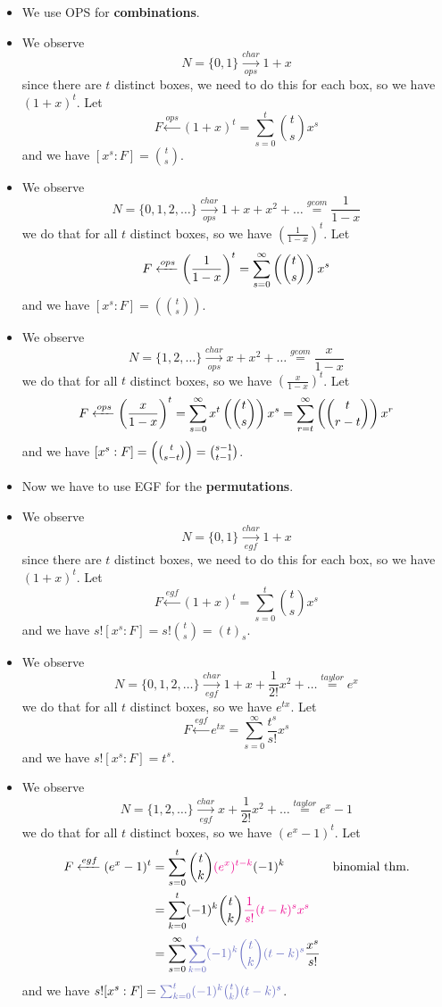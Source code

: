 \documentclass[12pt]{article}
\begin{document}
\begin{itemize}
    \item[] We use OPS for \textbf{combinations}.
    \item[\circled{2}] We observe \[N=\{0,1\}\xrightarrow[ops]{char} 1+x\] 
    since there are $t$ distinct boxes, we need to do this for each box, so we have $(1+x)^t$. Let \[F\xleftarrow{ops}(1+x)^t=\sum_{s=0}^{t}{t\choose s}x^s\] and we have $[x^s:F]={t\choose s}$.
    \item[\circled{6}] We observe \[N=\{0,1,2,\dots\}\xrightarrow[ops]{char} 1+x+x^2+\dots \stackrel{geom}{=} \frac{1}{1-x}\] we do that for all $t$ distinct boxes, so we have $\left(\frac{1}{1-x}\right)^t$. Let \[F\xleftarrow{ops}\left(\frac{1}{1-x}\right)^t=\sum_{s=0}^{\infty}\left({t\choose s}\right)x^s\] and we have $[x^s:F]=\left({t\choose s}\right)$.
    \item[\circled{10}]  We observe \[N=\{1,2,\dots\}\xrightarrow[ops]{char} x+x^2+\dots \stackrel{geom}{=} \frac{x}{1-x}\] we do that for all $t$ distinct boxes, so we have $\left(\frac{x}{1-x}\right)^t$. Let \[F\xleftarrow{ops}\left(\frac{x}{1-x}\right)^t=\sum_{s=0}^{\infty}x^t \left({t\choose s}\right)x^s = \sum_{r=t}^{\infty}\left({t\choose r-t}\right)x^r\] and we have $[x^s:F]=\left({t\choose s-t}\right)={s-1\choose t-1}$.
    \item[] Now we have to use EGF for the \textbf{permutations}.
    \item[\circled 1] We observe \[N=\{0,1\}\xrightarrow[egf]{char} 1+x\] since there are $t$ distinct boxes, we need to do this for each box, so we have $(1+x)^t$. Let \[F\xleftarrow{egf}(1+x)^t=\sum_{s=0}^{t}{t\choose s}x^s\] and we have $s![x^s:F]=s!{t\choose s} = (t)_s$.
    \item[\circled 5] We observe \[N=\{0,1,2,\dots\}\xrightarrow[egf]{char} 1+x+\frac{1}{2!}x^2+\dots \stackrel{taylor}{=} e^x\] we do that for all $t$ distinct boxes, so we have $e^{tx}$. Let \[F\xleftarrow{egf}e^{tx}=\sum_{s=0}^{\infty}\frac{t^s}{s!}x^s\] and we have $s![x^s:F]=t^s$.
    \item[\circled 9] We observe \[N=\{1,2,\dots\}\xrightarrow[egf]{char} x+\frac{1}{2!}x^2+\dots \stackrel{taylor}{=} e^x-1\] we do that for all $t$ distinct boxes, so we have $(e^{x}-1)^t$. Let \begin{align*}
        F\xleftarrow{egf}(e^{x}-1)^t&=\sum_{s=0}^{t}{t\choose k} \rt{(e^x)^{t-k}}(-1)^k &&\text{binomial thm.}\\
        &= \sum_{k=0}^{t}(-1)^k{t\choose k}\rt{\frac{1}{s!}(t-k)^sx^s}\\
        &= \sum_{s=0}^{\infty}\pt{\sum_{k=0}^{t}(-1)^k{t\choose k}(t-k)^s}\frac{x^s}{s!}
    \end{align*} and we have $s![x^s:F]=\pt{\sum_{k=0}^{t}(-1)^k{t\choose k}(t-k)^s}$.
\end{itemize}
\end{document}
